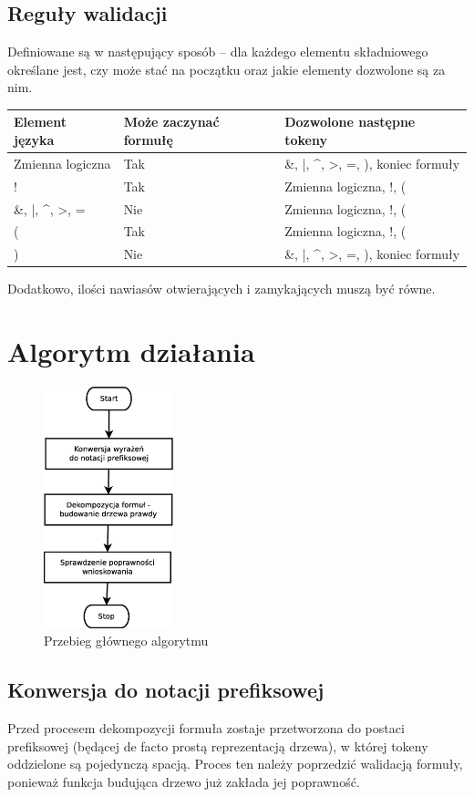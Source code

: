 \documentclass[12pt,a4paper,titlepage]{article}
\begin{document}
\subsection{Reguły walidacji}
Definiowane są w następujący sposób – dla każdego elementu składniowego określane jest, czy może stać na początku oraz jakie elementy dozwolone są za nim.

\begin{tabular}{|C{3cm}|C{3cm}|C{5cm}|}
\hline
\textbf{Element języka} & \textbf{Może zaczynać formułę} & Dozwolone następne tokeny\\
\hline
Zmienna logiczna & Tak & \&, |, \^{}, >, =, ), koniec formuły\\
\hline
! & Tak & Zmienna logiczna, !, (\\
\hline
\&, |, \^{}, >, = & Nie & Zmienna logiczna, !, (\\
\hline
( & Tak & Zmienna logiczna, !, (\\
\hline
) & Nie & \&, |, \^{}, >, =, ), koniec formuły\\
\hline
\end{tabular}

Dodatkowo, ilości nawiasów otwierających i zamykających muszą być równe.
\newpage

\section{Algorytm działania}

\begin{figure}[!htb]
\centering
\includegraphics[height=7cm]{main_alg}
\caption{Przebieg głównego algorytmu}
\end{figure}

\subsection{Konwersja do notacji prefiksowej}
Przed procesem dekompozycji formuła zostaje przetworzona do postaci prefiksowej (będącej de facto prostą reprezentacją drzewa), w której tokeny oddzielone są pojedynczą spacją. Proces ten należy poprzedzić walidacją formuły, ponieważ funkcja budująca drzewo już zakłada jej poprawność.
\end{document}
